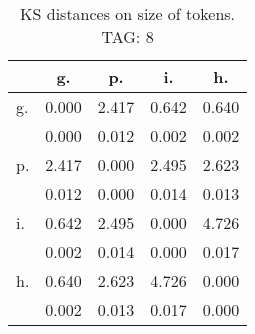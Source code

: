 \begin{table}[h!]
\begin{center}
\begin{tabular}{| l | c | c | c | c |}\hline
 & g. & p. & i. & h. \\\hline
g. & 0.000  & 2.417  & 0.642  & 0.640 \\\hline
 & 0.000  & 0.012  & 0.002  & 0.002 \\\hline
p. & 2.417  & 0.000  & 2.495  & 2.623 \\\hline
 & 0.012  & 0.000  & 0.014  & 0.013 \\\hline
i. & 0.642  & 2.495  & 0.000  & 4.726 \\\hline
 & 0.002  & 0.014  & 0.000  & 0.017 \\\hline
h. & 0.640  & 2.623  & 4.726  & 0.000 \\\hline
 & 0.002  & 0.013  & 0.017  & 0.000 \\\hline
\end{tabular}
\caption{KS distances on size of tokens. TAG: 8}
\end{center}
\end{table}